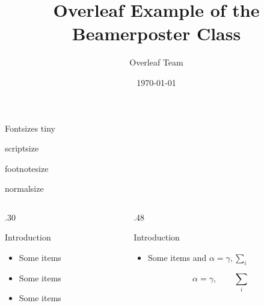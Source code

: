 \documentclass{beamer}
\title[Beamer Poster]{Overleaf Example of the Beamerposter Class}
\author[welcome@overleaf.com]{Overleaf Team}
\institute[Overleaf University]
{The Overleaf Institute, Learn Faculty}
\date{\today}
\begin{document}
	
	\begin{frame}{}
		
		\begin{block}{\large Fontsizes}
			\centering
			{\tiny tiny}\par
			{\scriptsize scriptsize}\par
			{\footnotesize footnotesize}\par
			{\normalsize normalsize}\par
		\end{block}
		
		\vfill
		
		\begin{columns}[t]
			
			\begin{column}{.30\linewidth}
				
				\begin{block}{Introduction}
					\begin{itemize}
						\item Some items
						\item Some items
						\item Some items
					\end{itemize}
				\end{block}
				
			\end{column}
			
			\begin{column}{.48\linewidth}
				
				\begin{block}{Introduction}
					\begin{itemize}
						\item Some items and
						$\alpha=\gamma,\sum_i$
					\end{itemize}
					
					\[
					\alpha=\gamma,\qquad
					\sum_i
					\]
					
				\end{block}
				
			\end{column}
			
		\end{columns}
		
	\end{frame}
	
\end{document}
